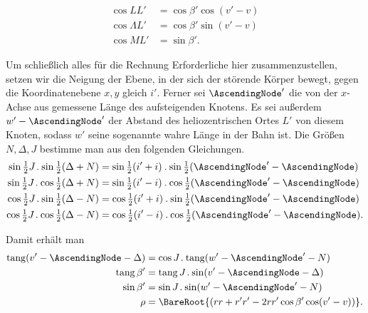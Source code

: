 \[
\begin{aligned}
\cos LL'&=\cos\beta'\cos(v'-v)\\
\cos\Lambda L'&=\cos\beta'\sin(v'-v)\\
\cos ML'&=\sin\beta'.
\end{aligned}
\]
\par Um schließlich alles für die Rechnung Erforderliche hier zusammenzustellen, setzen wir die Neigung der Ebene, in der sich der störende Körper bewegt, gegen die Koordinatenebene \(x,y\) gleich \(i'\). Ferner sei \(\AscendingNode'\) die von der \(x\)-Achse aus gemessene Länge des aufsteigenden Knotens. Es sei außerdem \(w'-\AscendingNode'\) der Abstand des heliozentrischen Ortes \(L'\) von diesem Knoten, sodass \(w'\) seine sogenannte wahre Länge in der Bahn ist. Die Größen \(N,\Delta,J\) bestimme man aus den folgenden Gleichungen.
\[
\begin{aligned}
\sin\tfrac12J\mathbin{.}\sin\tfrac12(\Delta+N)&=\sin\tfrac12(i'+i)\mathbin{.}\sin\tfrac12(\AscendingNode'-\AscendingNode)\\
\sin\tfrac12J\mathbin{.}\cos\tfrac12(\Delta+N)&=\sin\tfrac12(i'-i)\mathbin{.}\cos\tfrac12(\AscendingNode'-\AscendingNode)\\
\cos\tfrac12J\mathbin{.}\sin\tfrac12(\Delta-N)&=\cos\tfrac12(i'+i)\mathbin{.}\sin\tfrac12(\AscendingNode'-\AscendingNode)\\
\cos\tfrac12J\mathbin{.}\cos\tfrac12(\Delta-N)&=\cos\tfrac12(i'-i)\mathbin{.}\cos\tfrac12(\AscendingNode'-\AscendingNode).
\end{aligned}
\]
\par Damit erhält man
\[
\begin{aligned}
\operatorname{tang}(v'-\AscendingNode-\Delta)&=\cos J\mathbin{.}\operatorname{tang}(w'-\AscendingNode'-N)\\
\operatorname{tang}\beta'&=\operatorname{tang}J\mathbin{.}\sin(v'-\AscendingNode-\Delta)\\
\sin\beta'&=\sin J\mathbin{.}\sin(w'-\AscendingNode'-N)\\
\rho&=\BareRoot{(rr+r'r'-2rr'\cos\beta'\cos(v'-v))}.
\end{aligned}
\]
